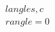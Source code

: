 \documentclass[preview]{standalone}
\begin{document}
\begin{align*}
\quad\\langle s, c \quad\\rangle = 0
\end{align*}
\end{document}
